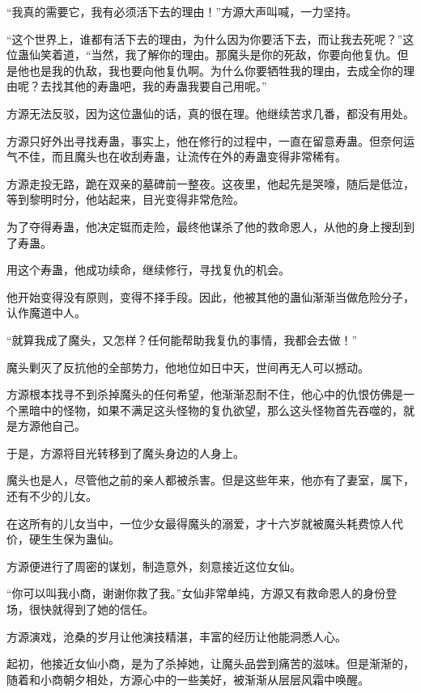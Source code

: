 
\begin{this_body}



“我真的需要它，我有必须活下去的理由！”方源大声叫喊，一力坚持。

“这个世界上，谁都有活下去的理由，为什么因为你要活下去，而让我去死呢？”这位蛊仙笑着道，“当然，我了解你的理由。那魔头是你的死敌，你要向他复仇。但是他也是我的仇敌，我也要向他复仇啊。为什么你要牺牲我的理由，去成全你的理由呢？去找其他的寿蛊吧，我的寿蛊我要自己用呢。”

方源无法反驳，因为这位蛊仙的话，真的很在理。他继续苦求几番，都没有用处。

方源只好外出寻找寿蛊，事实上，他在修行的过程中，一直在留意寿蛊。但奈何运气不佳，而且魔头也在收刮寿蛊，让流传在外的寿蛊变得非常稀有。

方源走投无路，跪在双亲的墓碑前一整夜。这夜里，他起先是哭嚎，随后是低泣，等到黎明时分，他站起来，目光变得非常危险。

为了夺得寿蛊，他决定铤而走险，最终他谋杀了他的救命恩人，从他的身上搜刮到了寿蛊。

用这个寿蛊，他成功续命，继续修行，寻找复仇的机会。

他开始变得没有原则，变得不择手段。因此，他被其他的蛊仙渐渐当做危险分子，认作魔道中人。

“就算我成了魔头，又怎样？任何能帮助我复仇的事情，我都会去做！”

魔头剿灭了反抗他的全部势力，他地位如日中天，世间再无人可以撼动。

方源根本找寻不到杀掉魔头的任何希望，他渐渐忍耐不住，他心中的仇恨仿佛是一个黑暗中的怪物，如果不满足这头怪物的复仇欲望，那么这头怪物首先吞噬的，就是方源他自己。

于是，方源将目光转移到了魔头身边的人身上。

魔头也是人，尽管他之前的亲人都被杀害。但是这些年来，他亦有了妻室，属下，还有不少的儿女。

在这所有的儿女当中，一位少女最得魔头的溺爱，才十六岁就被魔头耗费惊人代价，硬生生保为蛊仙。

方源便进行了周密的谋划，制造意外，刻意接近这位女仙。

“你可以叫我小商，谢谢你救了我。”女仙非常单纯，方源又有救命恩人的身份登场，很快就得到了她的信任。

方源演戏，沧桑的岁月让他演技精湛，丰富的经历让他能洞悉人心。

起初，他接近女仙小商，是为了杀掉她，让魔头品尝到痛苦的滋味。但是渐渐的，随着和小商朝夕相处，方源心中的一些美好，被渐渐从层层风霜中唤醒。


\end{this_body}
